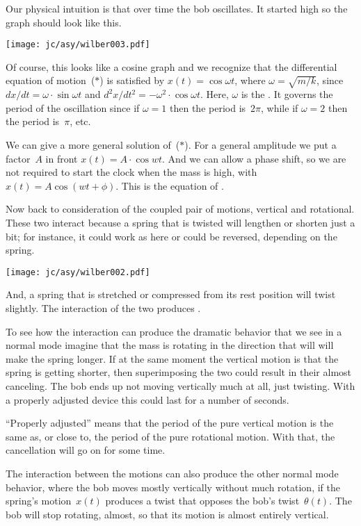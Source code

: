 Our physical intuition is that over time the bob oscillates.
It started high so 
the graph should look like this.
\begin{center}
  \texttt{[image: jc/asy/wilber003.pdf]}
\end{center}
Of course, this looks like a cosine graph and we recognize 
that the differential equation of motion~($*$) is satisfied by
$x(t)=\cos \omega t$, where $\omega=\sqrt{m/k}$,
since $dx/dt=\omega\cdot \sin \omega t$
and $d^2x/dt^2=-\omega^2\cdot \cos \omega t$.
Here, $\omega$ is the .
It governs the period of the oscillation since if $\omega=1$ then the
period is~$2\pi$, while if $\omega=2$ then the period is~$\pi$, etc.

We can give a more general solution of~($*$).
For a general amplitude we put a factor~$A$ in front
$x(t)=A\cdot \cos wt$.
And we can allow a phase shift, 
so we are not required to start the clock when the
mass is high, with 
$x(t)=A\cos (wt+\phi)$.
This is the equation of .

Now back to consideration of the coupled pair of motions, 
vertical and rotational.
These two interact because a spring that is twisted will 
lengthen or shorten just a bit;
for instance, it could work as here or could be reversed, depending on the
spring.  
\begin{center}
  \texttt{[image: jc/asy/wilber002.pdf]}
\end{center}
And, a spring that is stretched or compressed from its rest
position will twist slightly.
The interaction of the two produces .

To see how the interaction can produce the dramatic behavior that
we see in a normal mode
imagine that the mass is rotating in the direction that will 
will make the spring longer.
If at the same moment the vertical motion is that the spring 
is getting shorter, 
then superimposing the two
could result in their almost canceling.
The bob ends up not moving vertically much at all, just twisting.
With a properly adjusted device this could last for a number of seconds.

``Properly adjusted'' means that  
the period of the pure vertical motion is the same as, 
or close to, the period of the pure rotational motion.
With that, the cancellation will go on for some time. 

The interaction between the motions can also produce the other normal mode 
behavior, where the bob moves mostly vertically without much rotation,
if the spring's motion~$x(t)$ 
produces a twist that opposes the bob's twist~$\theta(t)$.
The bob will stop rotating, almost, so that
its motion is almost entirely vertical.

